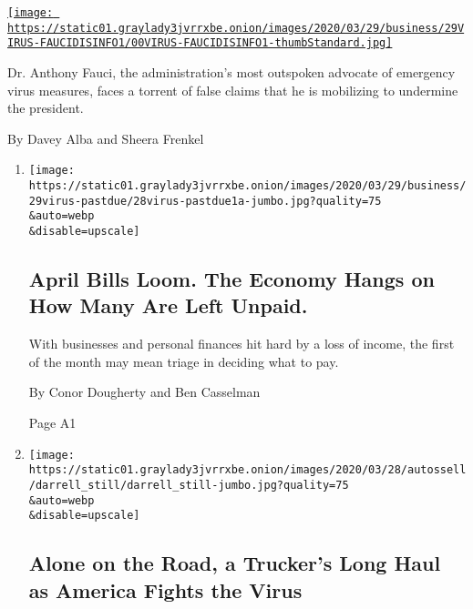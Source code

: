 \begin{enumerate}
\begin{enumerate}
    \href{/2020/03/28/technology/coronavirus-fauci-trump-conspiracy-target.html}{\texttt{[image: https://static01.graylady3jvrrxbe.onion/images/2020/03/29/business/29VIRUS-FAUCIDISINFO1/00VIRUS-FAUCIDISINFO1-thumbStandard.jpg]}}

    Dr. Anthony Fauci, the administration's most outspoken advocate of
    emergency virus measures, faces a torrent of false claims that he is
    mobilizing to undermine the president.

    By Davey Alba and Sheera Frenkel
  \end{enumerate}
\end{enumerate}

\begin{enumerate}
\def\labelenumi{\arabic{enumi}.}
\item
  \href{/2020/03/28/business/economy/coronavirus-bills-rent-payments.html}{}

  \texttt{[image: https://static01.graylady3jvrrxbe.onion/images/2020/03/29/business/29virus-pastdue/28virus-pastdue1a-jumbo.jpg?quality=75\\\&auto=webp\\\&disable=upscale]}

  \hypertarget{april-bills-loom-the-economy-hangs-on-how-many-are-left-unpaid}{%
  \subsection{April Bills Loom. The Economy Hangs on How Many Are Left
  Unpaid.}\label{april-bills-loom-the-economy-hangs-on-how-many-are-left-unpaid}}

  With businesses and personal finances hit hard by a loss of income,
  the first of the month may mean triage in deciding what to pay.

  By Conor Dougherty and Ben Casselman

  Page A1
\item
  \href{/2020/03/28/us/coronavirus-truckers.html}{}

  \texttt{[image: https://static01.graylady3jvrrxbe.onion/images/2020/03/28/autossell/darrell\_still/darrell\_still-jumbo.jpg?quality=75\\\&auto=webp\\\&disable=upscale]}

  \hypertarget{alone-on-the-road-a-truckers-long-haul-as-america-fights-the-virus}{%
  \subsection{Alone on the Road, a Trucker's Long Haul as America Fights
  the
  Virus}\label{alone-on-the-road-a-truckers-long-haul-as-america-fights-the-virus}}


\end{enumerate}
